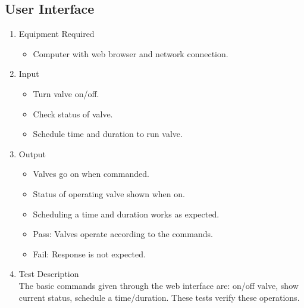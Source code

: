 \documentclass{article}
\begin{document}



\clearpage
\subsection{User Interface}

\begin{enumerate}
\item Equipment Required
	\begin{itemize}
	\item Computer with web browser and network connection.
	\end{itemize}
\item Input
	\begin{itemize}
	\item Turn valve on/off.
	\item Check status of valve.
	\item Schedule time and duration to run valve.
	\end{itemize}
\item Output
	\begin{itemize}
	\item Valves go on when commanded.
	\item Status of operating valve shown when on.
	\item Scheduling a time and duration works as expected.
	\item Pass: Valves operate according to the commands.
	\item Fail: Response is not expected.
	\end{itemize}
\item Test Description \\

The basic commands given through the web interface are:
on/off valve, show current status, schedule a time/duration.
These tests verify these operations.


\end{enumerate}
\end{document}
